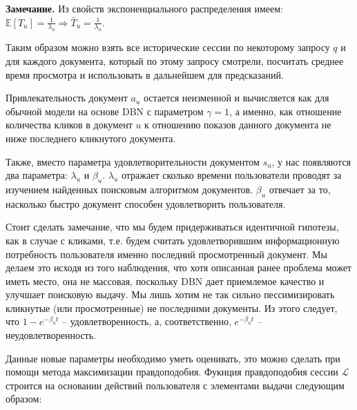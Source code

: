 \documentclass[diploma]{nanolab2015}
\begin{document}
  \textbf{Замечание.} Из свойств экспоненциального распределения имеем: $\mathbb{E}[T_u] = \frac{1}{\lambda_u} \Rightarrow \bar{T}_u = \frac{1}{\lambda_u}$.

  Таким образом можно взять все исторические сессии по некоторому запросу $q$ и для каждого документа, который по этому запросу смотрели, посчитать среднее время просмотра и использовать в дальнейшем для предсказаний.

  Привлекательность документ $a_u$ остается неизменной и вычисляется как для обычной модели на основе DBN с параметром $\gamma = 1$, а именно, как отношение количества кликов в документ $u$ к отношению показов данного документа не ниже последнего кликнутого документа.

  Также, вместо параметра удовлетворительности документом $s_u$, у нас появляются два параметра: $\lambda_u$ и $\beta_u$. $\lambda_u$ отражает сколько времени пользователи проводят за изучением найденных поисковым алгоритмом документов. $\beta_u$ отвечает за то, насколько быстро документ способен удовлетворить пользователя.

  Стоит сделать замечание, что мы будем придерживаться идентичной гипотезы, как в случае с кликами, т.е. будем считать удовлетворившим информационную потребность пользователя именно последний просмотренный документ. Мы делаем это исходя из того наблюдения, что хотя описанная ранее проблема может иметь место, она не массовая, поскольку DBN дает приемлемое качество и улучшает поисковую выдачу. Мы лишь хотим не так сильно пессимизировать кликнутые (или просмотренные) не последними документы. Из этого следует, что $1 - e^{-\beta_u t}$ -- удовлетворенность, а, соответственно, $e^{-\beta_u t}$ -- неудовлетворенность.

  Данные новые параметры необходимо уметь оценивать, это можно сделать при помощи метода максимизации правдоподобия. Фукнция правдоподобия сессии $\mathcal{L}$ строится на основании действий пользователя с элементами выдачи следующим образом:
\end{document}
